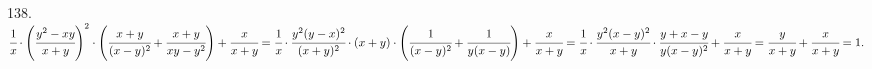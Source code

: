 138. $\cfrac{1}{x}\cdot\left(\cfrac{y^2-xy}{x+y}\right)^2\cdot\left(\cfrac{x+y}{(x-y)^2}+\cfrac{x+y}{xy-y^2}\right)+\cfrac{x}{x+y}=
\cfrac{1}{x}\cdot\cfrac{y^2(y-x)^2}{(x+y)^2}\cdot(x+y)\cdot\left(\cfrac{1}{(x-y)^2}+\cfrac{1}{y(x-y)}\right)+\cfrac{x}{x+y}=
\cfrac{1}{x}\cdot\cfrac{y^2(x-y)^2}{x+y}\cdot\cfrac{y+x-y}{y(x-y)^2}+\cfrac{x}{x+y}=
\cfrac{y}{x+y}+\cfrac{x}{x+y}=1.$\\
